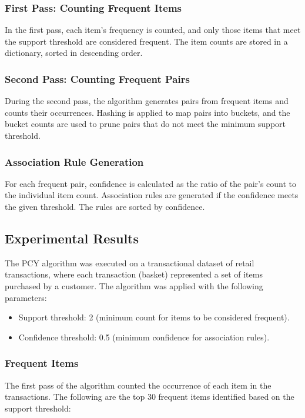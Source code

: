 \subsubsection{First Pass: Counting Frequent Items}
In the first pass, each item’s frequency is counted, and only those items that meet the support threshold are considered frequent.
The item counts are stored in a dictionary, sorted in descending order.

\subsubsection{Second Pass: Counting Frequent Pairs}
During the second pass, the algorithm generates pairs from frequent items and counts their occurrences.
Hashing is applied to map pairs into buckets, and the bucket counts are used to prune pairs that do not meet the minimum support threshold.

\subsubsection{Association Rule Generation}
For each frequent pair, confidence is calculated as the ratio of the pair’s count to the individual item count.
Association rules are generated if the confidence meets the given threshold.
The rules are sorted by confidence.

\subsection{Experimental Results}
\label{subsec:experimental-results}
The PCY algorithm was executed on a transactional dataset of retail transactions, where each transaction (basket) represented a set of items purchased by a customer. The algorithm was applied with the following parameters:
\begin{itemize}
    \item Support threshold: 2 (minimum count for items to be considered frequent).
    \item Confidence threshold: 0.5 (minimum confidence for association rules).
\end{itemize}

\subsubsection{Frequent Items}
The first pass of the algorithm counted the occurrence of each item in the transactions. The following are the top 30 frequent items identified based on the support threshold:

